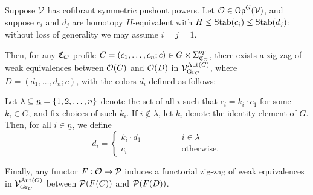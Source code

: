 \documentclass[a4paper,10pt
,draft
]{article}%
\renewcommand{\1}{\eta}%
\begin{document}
\begin{lemma}
      \label{CAV_4.14_PROP2}
      Suppose $\V$ has cofibrant symmetric pushout powers.
      Let $\O \in \Op^G(\V)$, and suppose
      $c_i$ and $d_j$ are homotopy $H$-equivalent with $H \leq \Stab(c_i) \leq \Stab(d_j)$;
      without loss of generality we may assume $i = j = 1$.

      Then, for any $\mathfrak C_\O$-profile $C = (c_1,\dots,c_n;c) \in G \ltimes \Sigma_{\mathfrak C_\O}^{op}$,
      there exists a zig-zag of weak equivalences between
      $\O(C)$ and $\O(D)$
      in $\V^{\Aut(C)}_{\mathrm{Gr}_C}$,
      where
      $D = (d_1,\ldots, d_n; c)$, with the colors $d_i$ defined as follows:
            
      Let $\lambda \subseteq \underline{n} = \set{1,2,\ldots, n}$ denote
      the set of all $i$ such that $c_i = k_i \cdot c_1$ for some $k_i\in G$,
      and fix choices of such $k_i$.
      If $i \notin \lambda$, let $k_i$ denote the identity element of $G$.
      Then, for all $i \in \underline{n}$, we define
      \begin{equation}
            \label{DCOLORS_EQ}
            d_i =
            \begin{cases}
                  k_i \cdot d_1 \qquad \qquad & i \in \lambda
                  \\
                  c_i & \mbox{otherwise.}
            \end{cases}
      \end{equation}
      
      Finally, any functor $F: \O \to \P$ induces a functorial zig-zag of weak equivalences in $\V^{\Aut(C)}_{\mathrm{Gr}_C}$
      between $\P(F(C))$ and $\P(F(D))$.
\end{lemma}
\end{document}
